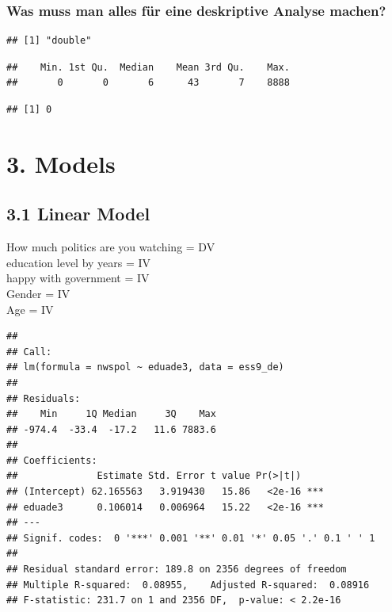 \documentclass[
]{article}
\begin{document}
\hypertarget{was-muss-man-alles-fuxfcr-eine-deskriptive-analyse-machen}{%
\subsubsection{\texorpdfstring{\textbf{Was muss man alles für eine
deskriptive Analyse
machen?}}{Was muss man alles für eine deskriptive Analyse machen?}}\label{was-muss-man-alles-fuxfcr-eine-deskriptive-analyse-machen}}

\begin{verbatim}
## [1] "double"
\end{verbatim}

\begin{verbatim}
##    Min. 1st Qu.  Median    Mean 3rd Qu.    Max. 
##       0       0       6      43       7    8888
\end{verbatim}

\begin{verbatim}
## [1] 0
\end{verbatim}

\hypertarget{models}{%
\section{3. Models}\label{models}}

\hypertarget{linear-model}{%
\subsection{3.1 Linear Model}\label{linear-model}}

How much politics are you watching = DV\\
education level by years = IV\\
happy with government = IV\\
Gender = IV\\
Age = IV

\begin{verbatim}
## 
## Call:
## lm(formula = nwspol ~ eduade3, data = ess9_de)
## 
## Residuals:
##    Min     1Q Median     3Q    Max 
## -974.4  -33.4  -17.2   11.6 7883.6 
## 
## Coefficients:
##              Estimate Std. Error t value Pr(>|t|)    
## (Intercept) 62.165563   3.919430   15.86   <2e-16 ***
## eduade3      0.106014   0.006964   15.22   <2e-16 ***
## ---
## Signif. codes:  0 '***' 0.001 '**' 0.01 '*' 0.05 '.' 0.1 ' ' 1
## 
## Residual standard error: 189.8 on 2356 degrees of freedom
## Multiple R-squared:  0.08955,    Adjusted R-squared:  0.08916 
## F-statistic: 231.7 on 1 and 2356 DF,  p-value: < 2.2e-16
\end{verbatim}
\end{document}
